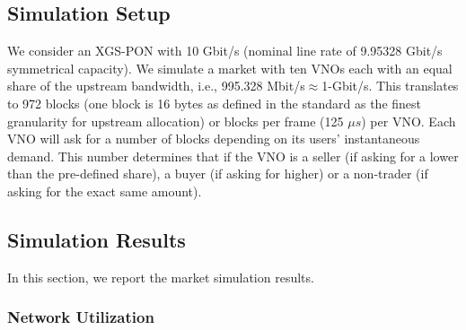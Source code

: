 \subsection{Simulation Setup}
We consider an XGS-PON \cite{G.9807.1} with 10 Gbit/s (nominal line rate of 9.95328 Gbit/s symmetrical capacity). We simulate a market with ten \acp{VNO} each with an equal share of the upstream bandwidth, i.e., 995.328 Mbit/s$\approx$1-Gbit/s. This translates to 972 blocks (one block is 16 bytes as defined in the standard \cite{G.9807.1} as the finest granularity for upstream allocation) or blocks per frame (125 $\mu s$) per VNO.
Each \ac{VNO} will ask for a number of blocks depending on its users' instantaneous demand. This number determines that if the \ac{VNO} is a seller (if asking for a lower than the pre-defined share), a buyer (if asking for higher) or a non-trader (if asking for the exact same amount).



\subsection{Simulation Results}
In this section, we report the market simulation results.


\subsubsection{Network Utilization}

